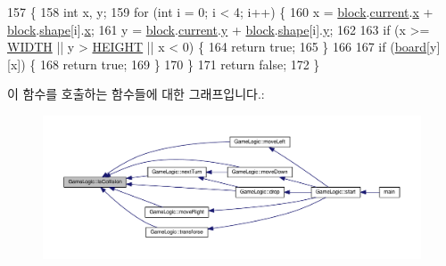 \begin{DoxyCode}
157                             \{
158     \textcolor{keywordtype}{int} x, y;
159     \textcolor{keywordflow}{for} (\textcolor{keywordtype}{int} i = 0; i < 4; i++) \{
160         x = \hyperlink{class_game_logic_a499d9b05317bb6a77bf3521f42a6638a}{block}.\hyperlink{class_block_aeb5dd312b719966752ba4b38720a4535}{current}.\hyperlink{struct_point_a8c779e11e694b20e0946105a9f5de842}{x} + \hyperlink{class_game_logic_a499d9b05317bb6a77bf3521f42a6638a}{block}.\hyperlink{class_block_ae1a4e97236e1e5f04d21fc9227b8c3a8}{shape}[i].\hyperlink{struct_point_a8c779e11e694b20e0946105a9f5de842}{x};
161         y = \hyperlink{class_game_logic_a499d9b05317bb6a77bf3521f42a6638a}{block}.\hyperlink{class_block_aeb5dd312b719966752ba4b38720a4535}{current}.\hyperlink{struct_point_a2e1b5fb2b2a83571f5c0bc0f66a73cf7}{y} + \hyperlink{class_game_logic_a499d9b05317bb6a77bf3521f42a6638a}{block}.\hyperlink{class_block_ae1a4e97236e1e5f04d21fc9227b8c3a8}{shape}[i].\hyperlink{struct_point_a2e1b5fb2b2a83571f5c0bc0f66a73cf7}{y};
162 
163         \textcolor{keywordflow}{if} (x >= \hyperlink{_game_logic_8h_a9649ab8139c4c2ea5c93625b30d92a05}{WIDTH} || y > \hyperlink{_game_logic_8h_af728b7647e0b8c49832983a31f9a2e9b}{HEIGHT} || x < 0) \{
164             \textcolor{keywordflow}{return} \textcolor{keyword}{true};
165         \}
166 
167         \textcolor{keywordflow}{if} (\hyperlink{class_game_logic_a71071a20595279a580d18dfa60ed4a1c}{board}[y][x]) \{
168             \textcolor{keywordflow}{return} \textcolor{keyword}{true};
169         \}
170     \}
171     \textcolor{keywordflow}{return} \textcolor{keyword}{false};
172 \}
\end{DoxyCode}


이 함수를 호출하는 함수들에 대한 그래프입니다.\+:
\nopagebreak
\begin{figure}[H]
\begin{center}
\leavevmode
\includegraphics[width=350pt]{class_game_logic_a1c534033fe42c8af4fb0e11e3fed2cfa_icgraph}
\end{center}
\end{figure}


